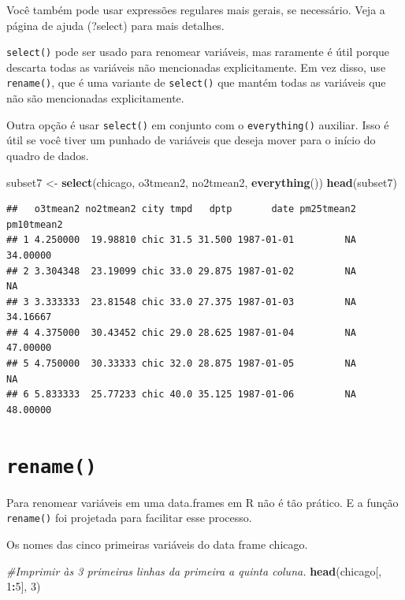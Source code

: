 \documentclass[a4paper]{book}
\newenvironment{Shaded}{\begin{snugshade}}{\end{snugshade}}
\newcommand{\CommentTok}[1]{\textcolor[rgb]{0.56,0.35,0.01}{\textit{#1}}}
\newcommand{\DecValTok}[1]{\textcolor[rgb]{0.00,0.00,0.81}{#1}}
\newcommand{\KeywordTok}[1]{\textcolor[rgb]{0.13,0.29,0.53}{\textbf{#1}}}
\newcommand{\NormalTok}[1]{#1}
\newcommand{\OperatorTok}[1]{\textcolor[rgb]{0.81,0.36,0.00}{\textbf{#1}}}
\newcommand{\StringTok}[1]{\textcolor[rgb]{0.31,0.60,0.02}{#1}}
\begin{document}
Você também pode usar expressões regulares mais gerais, se necessário. Veja a página de ajuda (?select) para mais detalhes.

\texttt{select()} pode ser usado para renomear variáveis, mas raramente é útil porque descarta todas as variáveis não mencionadas explicitamente. Em vez disso, use \texttt{rename()}, que é uma variante de \texttt{select()} que mantém todas as variáveis que não são mencionadas explicitamente.

Outra opção é usar \texttt{select()} em conjunto com o \texttt{everything()} auxiliar. Isso é útil se você tiver um punhado de variáveis que deseja mover para o início do quadro de dados.

\begin{Shaded}
\begin{Highlighting}[]
\NormalTok{subset7 <-}\StringTok{ }\KeywordTok{select}\NormalTok{(chicago, o3tmean2, no2tmean2, }\KeywordTok{everything}\NormalTok{())}
\KeywordTok{head}\NormalTok{(subset7)}
\end{Highlighting}
\end{Shaded}

\begin{verbatim}
##   o3tmean2 no2tmean2 city tmpd   dptp       date pm25tmean2 pm10tmean2
## 1 4.250000  19.98810 chic 31.5 31.500 1987-01-01         NA   34.00000
## 2 3.304348  23.19099 chic 33.0 29.875 1987-01-02         NA         NA
## 3 3.333333  23.81548 chic 33.0 27.375 1987-01-03         NA   34.16667
## 4 4.375000  30.43452 chic 29.0 28.625 1987-01-04         NA   47.00000
## 5 4.750000  30.33333 chic 32.0 28.875 1987-01-05         NA         NA
## 6 5.833333  25.77233 chic 40.0 35.125 1987-01-06         NA   48.00000
\end{verbatim}

\hypertarget{rename}{%
\section{\texorpdfstring{\texttt{rename()}}{rename()}}\label{rename}}

Para renomear variáveis em uma data.frames em R não é tão prático. E a função \texttt{rename()} foi projetada para facilitar esse processo.

Os nomes das cinco primeiras variáveis do data frame chicago.

\begin{Shaded}
\begin{Highlighting}[]
\CommentTok{#Imprimir às 3 primeiras linhas da primeira a quinta coluna.}
\KeywordTok{head}\NormalTok{(chicago[, }\DecValTok{1}\OperatorTok{:}\DecValTok{5}\NormalTok{], }\DecValTok{3}\NormalTok{)}
\end{Highlighting}
\end{Shaded}
\end{document}
